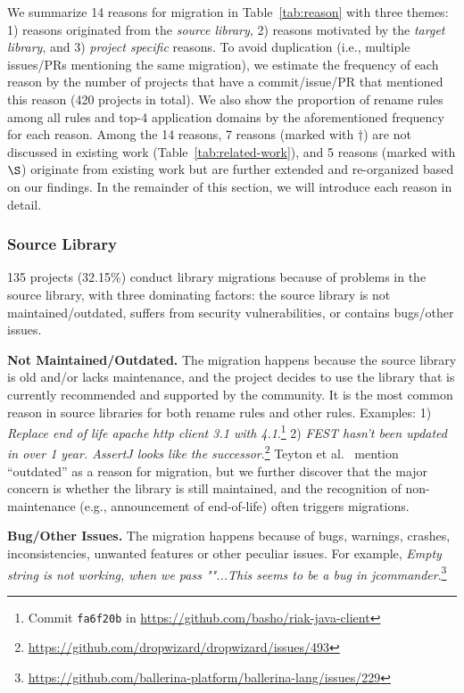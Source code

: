\documentclass[sigconf, screen]{acmart}
\begin{document}
We summarize 14 reasons for migration in Table~\ref{tab:reason} with three themes: 1) reasons originated from the \textit{source library}, 2) reasons motivated by the \textit{target library}, and 3) \textit{project specific} reasons.
To avoid duplication (i.e., multiple issues/PRs mentioning the same migration), we estimate the frequency of each reason by the number of projects that have a commit/issue/PR that mentioned this reason (420 projects in total).
We also show the proportion of rename rules among all rules and top-4 application domains by the aforementioned frequency for each reason.
Among the 14 reasons, 7 reasons (marked with $\dag$) are not discussed in existing work (Table~\ref{tab:related-work}), and 5 reasons (marked with $\S$) originate from existing work but are further extended and re-organized based on our findings.
In the remainder of this section, we will introduce each reason in detail.

\subsubsection{Source Library}

135 projects (32.15\%) conduct library migrations because of problems in the source library, with three dominating factors: the source library is not maintained/outdated, suffers from security vulnerabilities, or contains bugs/other issues.

\textbf{Not Maintained/Outdated.} 
The migration happens because the source library is old and/or lacks maintenance, and the project decides to use the library that is currently recommended and supported by the community.
It is the most common reason in source libraries for both rename rules and other rules. 
Examples: 1) \textit{Replace end of life apache http client 3.1 with 4.1}.\footnote{Commit \texttt{fa6f20b} in \url{https://github.com/basho/riak-java-client}}
2) \textit{FEST hasn't been updated in over 1 year. AssertJ looks like the successor}.\footnote{\url{https://github.com/dropwizard/dropwizard/issues/493}}
Teyton et al.~\cite{teyton2012mining} mention ``outdated'' as a reason for migration, but we further discover that the major concern is whether the library is still maintained, and the recognition of non-maintenance (e.g., announcement of end-of-life) often triggers migrations.

\textbf{Bug/Other Issues.}
The migration happens because of bugs, warnings, crashes, inconsistencies, unwanted features or other peculiar issues.
For example, \textit{Empty string is not working, when we pass ""...This seems to be a bug in jcommander}.\footnote{\url{https://github.com/ballerina-platform/ballerina-lang/issues/229}}
\end{document}
